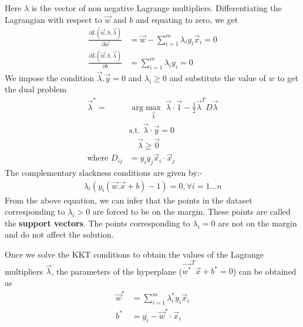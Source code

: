 \documentclass[journal]{IEEEtran}
\begin{document}
Here $\lambda$ is the vector of non negative Lagrange multipliers. 
Differentiating the Lagrangian with respect to $\vec{w}$ and $b$ and equating to zero, we get
\begin{align}
    \frac{\partial L(\vec{w}, b, \vec{\lambda})}{\partial \vec{w}} &= \vec{w} - \sum_{i=1}^{m} \lambda_i y_i \vec{x}_i = 0 \\
    \frac{\partial L(\vec{w}, b, \vec{\lambda})}{\partial b} &= \sum_{i=1}^{m} \lambda_i y_i = 0
\end{align}
We impose the condition $\vec{\lambda}.\vec{y} = 0$ and $\lambda_i \geq 0$  and substitute the value of $w$ to get the dual problem
\begin{align}
    \vec{\lambda}^* = &\text{ arg}\max_{\vec{\lambda}} \;\vec{\lambda}\cdot \vec{1} - \frac{1}{2} \vec{\lambda}^T D \vec{\lambda} \\
    &\text{s.t. } \vec{\lambda} \cdot \vec{y} = 0 \nonumber \\
    & \quad \vec{\lambda} \geq \vec{0} \nonumber \\
    \text{where } D_{ij} &= y_i y_j \vec{x}_i \cdot \vec{x}_j
\end{align}
The complementary slackness conditions are given by:-
\begin{align}
    \lambda_i (y_i(\vec{w}.\vec{x} + b) - 1) = 0, \forall i = 1...n
\end{align}
From the above equation, we can infer that the points in the dataset corresponding to $\lambda_i > 0$ are forced to be on the margin. These points are called the \textbf{support vectors}. The points corresponding to $\lambda_i = 0$ are not on the margin and do not affect the solution.


Once we solve the KKT conditions to obtain the values of the Lagrange multipliers $\vec{\lambda}$, the parameters of the hyperplane ($\vec{w^*}^T\vec{x} + b^* = 0$) can be obtained as
\begin{align}
    \vec{w}^* &= \sum_{i=1}^{m} \lambda_i^* y_i \vec{x}_i \\
    b^* &= y_i - \vec{w}^* \cdot \vec{x}_i
\end{align} 
\end{document}
